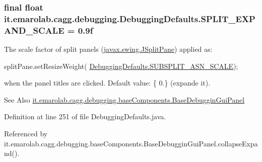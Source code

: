 \hypertarget{classit_1_1emarolab_1_1cagg_1_1debugging_1_1DebuggingDefaults_ab77fc428ffc6607d3821c79b96ec0121}{
\subsubsection[{S\-P\-L\-I\-T\-\_\-\-E\-X\-P\-A\-N\-D\-\_\-\-S\-C\-A\-L\-E}]{\setlength{\rightskip}{0pt plus 5cm}final float it.\-emarolab.\-cagg.\-debugging.\-Debugging\-Defaults.\-S\-P\-L\-I\-T\-\_\-\-E\-X\-P\-A\-N\-D\-\_\-\-S\-C\-A\-L\-E = 0.\-9f\hspace{0.3cm}{\ttfamily [static]}}}\label{classit_1_1emarolab_1_1cagg_1_1debugging_1_1DebuggingDefaults_ab77fc428ffc6607d3821c79b96ec0121}
The scale factor of split panels (\hyperlink{}{javax.\-swing.\-J\-Split\-Pane}) applied as\-: 
\begin{DoxyCode}
splitPane.setResizeWeight( \hyperlink{classit_1_1emarolab_1_1cagg_1_1debugging_1_1DebuggingDefaults_adf7088c65243e935301c9a31f4dfe2b4}{DebuggingDefaults.SUBSPLIT\_ASN\_SCALE}); 
\end{DoxyCode}
 when the panel titles are clicked. Default value\-: \{ 0.\} (expande it). \begin{DoxySeeAlso}{See Also}
\hyperlink{classit_1_1emarolab_1_1cagg_1_1debugging_1_1baseComponents_1_1BaseDebugginGuiPanel}{it.\-emarolab.\-cagg.\-debugging.\-base\-Components.\-Base\-Debuggin\-Gui\-Panel} 
\end{DoxySeeAlso}


Definition at line 251 of file Debugging\-Defaults.\-java.



Referenced by it.\-emarolab.\-cagg.\-debugging.\-base\-Components.\-Base\-Debuggin\-Gui\-Panel.\-collapse\-Expand().

